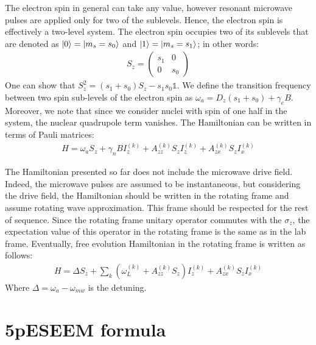 \documentclass[%
 reprint,
superscriptaddress,
 amsmath,amssymb,
 aps,
]{revtex4-2}
\begin{document}
The electron spin in general can take any value, however resonant microwave pulses are applied only for two of the sublevels. Hence, the electron spin is effectively a two-level system. The electron spin occupies two of its sublevels that are denoted as $\ket{0} = \ket{m_s=s_0}$ and $\ket{1} = \ket{m_s=s_1}$; in other words:
\begin{gather}
	S_z= \begin{pmatrix} s_1 & 0 \\ 0 & s_0\end{pmatrix}
\end{gather}
One can show that $S_z^2 = (s_1+s_0)S_z-s_1s_0 \mathds{1}$. 
We define the transition frequency between two spin sub-levels of the electron spin as $\omega_a = D_z (s_1+s_0)+\gamma_e B $. Moreover, we note that since we consider nuclei with spin of one half in the system, the nuclear quadrupole term vanishes. The Hamiltonian can be written in terms of Pauli matrices:
\begin{align}
	H =\omega_aS_z+ \gamma_n B I_z^{(k)} + A_{zz}^{(k)} S_z I_z^{(k)} + A_{zx}^{(k)} S_z I_x^{(k)}
\end{align}

The Hamiltonian presented so far does not include the microwave drive field. Indeed, the microwave pulses are assumed to be instantaneous, but considering the drive field, the Hamiltonian  should be written in the rotating frame and assume rotating wave approximation. This frame should be respected for the rest of sequence. Since the rotating frame unitary operator commutes with the $\sigma_z$, the expectation value of this operator in the rotating frame is the same as in the lab frame. Eventually, free evolution Hamiltonian in the rotating frame is written as follows:
\begin{align}
	H = \Delta S_z + \sum_k (\omega_L^{(k)}  + A_{zz}^{(k)} S_z) I_z^{(k)} + A_{zx}^{(k)} S_z I_x^{(k)}
\end{align}
Where $\Delta = \omega_a - \omega_{mw}$ is the detuning.


\section{5pESEEM formula}
\label{app:5pESEEM} 
\end{document}
